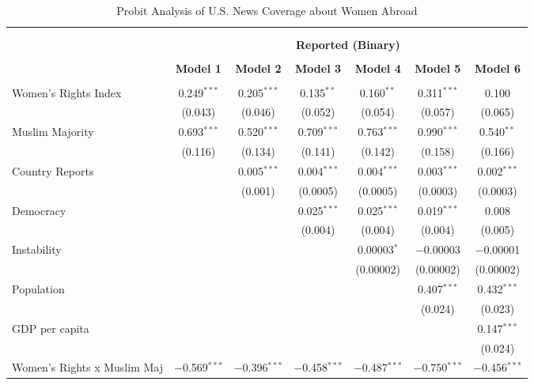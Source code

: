 
\begin{table}[!htbp] \centering 
  \caption{Probit Analysis of U.S. News Coverage about Women Abroad} 
  \label{table:probit-part} 
\begin{tabular}{@{\extracolsep{5pt}}lcccccc} 
\\[-1.8ex]\hline \\[-1.8ex] 
\\[-1.8ex] & \multicolumn{6}{c}{\textbf{Reported (Binary)}} \\ 
\\[-1.8ex] & \textbf{Model 1} & \textbf{Model 2} & \textbf{Model 3} & \textbf{Model 4} & \textbf{Model 5} & \textbf{Model 6}\\ 
\hline \\[-1.8ex] 
 Women's Rights Index & 0.249$^{***}$ & 0.205$^{***}$ & 0.135$^{**}$ & 0.160$^{**}$ & 0.311$^{***}$ & 0.100 \\ 
  & (0.043) & (0.046) & (0.052) & (0.054) & (0.057) & (0.065) \\ 
  Muslim Majority & 0.693$^{***}$ & 0.520$^{***}$ & 0.709$^{***}$ & 0.763$^{***}$ & 0.990$^{***}$ & 0.540$^{**}$ \\ 
  & (0.116) & (0.134) & (0.141) & (0.142) & (0.158) & (0.166) \\ 
  Country Reports &  & 0.005$^{***}$ & 0.004$^{***}$ & 0.004$^{***}$ & 0.003$^{***}$ & 0.002$^{***}$ \\ 
  &  & (0.001) & (0.0005) & (0.0005) & (0.0003) & (0.0003) \\ 
  Democracy &  &  & 0.025$^{***}$ & 0.025$^{***}$ & 0.019$^{***}$ & 0.008 \\ 
  &  &  & (0.004) & (0.004) & (0.004) & (0.005) \\ 
  Instability &  &  &  & 0.00003$^{*}$ & $-$0.00003 & $-$0.00001 \\ 
  &  &  &  & (0.00002) & (0.00002) & (0.00002) \\ 
  Population &  &  &  &  & 0.407$^{***}$ & 0.432$^{***}$ \\ 
  &  &  &  &  & (0.024) & (0.023) \\ 
  GDP per capita &  &  &  &  &  & 0.147$^{***}$ \\ 
  &  &  &  &  &  & (0.024) \\ 
  Women's Rights x Muslim Maj & $-$0.569$^{***}$ & $-$0.396$^{***}$ & $-$0.458$^{***}$ & $-$0.487$^{***}$ & $-$0.750$^{***}$ & $-$0.456$^{***}$ \\ 

\end{tabular}
\end{table}
